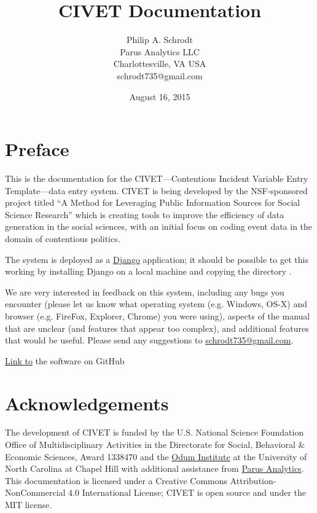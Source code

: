 \documentclass[letterpaper,10pt,english]{sphinxmanual}
\title{CIVET Documentation}
\date{August 16, 2015}
\author{Philip A. Schrodt\\Parus Analytics LLC\\Charlottesville, VA USA\\schrodt735@gmail.com}
\begin{document}
\maketitle
\tableofcontents
{}\label{index::doc}\section*{Preface}
This is the documentation for the CIVET—Contentious Incident Variable Entry Template—data entry system. CIVET is being developed by the NSF-sponsored project titled “A Method for Leveraging Public Information Sources for Social Science Research” which is creating tools to improve the efficiency of data generation in the social sciences, with an initial focus on coding event data in the domain of contentious politics.

The system is deployed as a \href{https://www.djangoproject.com/start/overview/}{Django} application; it should be possible to get this working by installing Django on a local machine and copying the directory .

We are very interested in feedback on this system, including any bugs
you encounter (please let us know what operating system (e.g. Windows,
OS-X) and browser (e.g. FireFox, Explorer, Chrome) you were using),
aspects of the manual that are unclear (and features that appear too
complex), and additional features that would be useful. Please send any
suggestions to \href{mailto:schrodt735@gmail.com}{schrodt735@gmail.com}.

\href{https://github.com/civet-software}{Link to} the software on GitHub
\section*{Acknowledgements}
The development of CIVET is funded by the U.S. National Science Foundation Office of Multidisciplinary Activities
in the Directorate for Social, Behavioral \& Economic Sciences, Award 1338470 and the \href{http://www.odum.unc.edu/odum/home2.jsp}{Odum Institute} at the University of North Carolina at Chapel Hill with additional assistance from \href{http://parusanalytics.com/}{Parus Analytics}. This documentation is licensed under a Creative Commons Attribution-NonCommercial 4.0 International License; CIVET is open source and under the MIT license.
\end{document}
